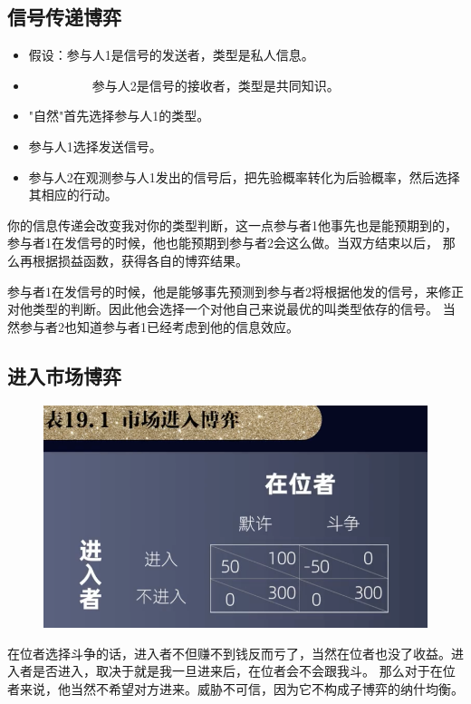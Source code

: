 \documentclass[12pt, a4paper]{article} %
\begin{document}
\begin{CJK*}{UTF8}{gbsn}
    \clearpage
    \section{信号传递博弈}
    \begin{itemize}
        \item[] 假设：参与人1是信号的发送者，类型是私人信息。
        \item[] ~~~~~~~~~~参与人2是信号的接收者，类型是共同知识。
    \end{itemize}
    \begin{itemize}
        \item "自然"首先选择参与人1的类型。
        \item 参与人1选择发送信号。
        \item 参与人2在观测参与人1发出的信号后，把先验概率转化为后验概率，然后选择其相应的行动。
    \end{itemize}
    你的信息传递会改变我对你的类型判断，这一点参与者1他事先也是能预期到的，参与者1在发信号的时候，他也能预期到参与者2会这么做。当双方结束以后，
    那么再根据损益函数，获得各自的博弈结果。\par
    参与者1在发信号的时候，他是能够事先预测到参与者2将根据他发的信号，来修正对他类型的判断。因此他会选择一个对他自己来说最优的叫类型依存的信号。
    当然参与者2也知道参与者1已经考虑到他的信息效应。

    \subsection{进入市场博弈}
    \begin{figure}[htbp]
        \includegraphics[width=1\textwidth]{./figures/catch2023-08-03-17.17.25.png}
    \end{figure}
    在位者选择斗争的话，进入者不但赚不到钱反而亏了，当然在位者也没了收益。进入者是否进入，取决于就是我一旦进来后，在位者会不会跟我斗。
    那么对于在位者来说，他当然不希望对方进来。威胁不可信，因为它不构成子博弈的纳什均衡。\par


\end{CJK*}
\end{document}
